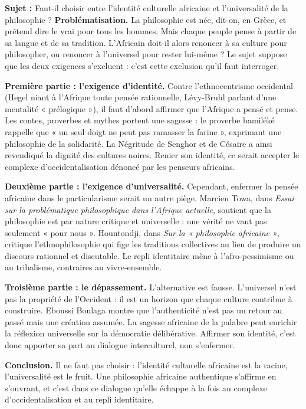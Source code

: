 \documentclass[11pt]{article}
\begin{document}
\begin{exoresolu}
\textbf{Sujet :} Faut-il choisir entre l'identité culturelle africaine et l'universalité de la philosophie ?
\tcblower
\textbf{Problématisation.} La philosophie est née, dit-on, en Grèce, et prétend dire le vrai pour tous les hommes. Mais chaque peuple pense à partir de sa langue et de sa tradition. L'Africain doit-il alors renoncer à sa culture pour philosopher, ou renoncer à l'universel pour rester lui-même ? Le sujet suppose que les deux exigences s'excluent : c'est cette exclusion qu'il faut interroger.

\textbf{Première partie : l'exigence d'identité.} Contre l'ethnocentrisme occidental (Hegel niant à l'Afrique toute pensée rationnelle, Lévy-Bruhl parlant d'une mentalité « prélogique »), il faut d'abord affirmer que l'Afrique a pensé et pense. Les contes, proverbes et mythes portent une sagesse : le proverbe bamiléké rappelle que « un seul doigt ne peut pas ramasser la farine », exprimant une philosophie de la solidarité. La Négritude de Senghor et de Césaire a ainsi revendiqué la dignité des cultures noires. Renier son identité, ce serait accepter le complexe d'occidentalisation dénoncé par les penseurs africains.

\textbf{Deuxième partie : l'exigence d'universalité.} Cependant, enfermer la pensée africaine dans le particularisme serait un autre piège. Marcien Towa, dans \emph{Essai sur la problématique philosophique dans l'Afrique actuelle}, soutient que la philosophie est par nature critique et universelle : une vérité ne vaut pas seulement « pour nous ». Hountondji, dans \emph{Sur la « philosophie africaine »}, critique l'ethnophilosophie qui fige les traditions collectives au lieu de produire un discours rationnel et discutable. Le repli identitaire mène à l'afro-pessimisme ou au tribalisme, contraires au vivre-ensemble.

\textbf{Troisième partie : le dépassement.} L'alternative est fausse. L'universel n'est pas la propriété de l'Occident : il est un horizon que chaque culture contribue à construire. Eboussi Boulaga montre que l'authenticité n'est pas un retour au passé mais une création assumée. La sagesse africaine de la palabre peut enrichir la réflexion universelle sur la démocratie délibérative. Affirmer son identité, c'est donc apporter sa part au dialogue interculturel, non s'enfermer.

\textbf{Conclusion.} Il ne faut pas choisir : l'identité culturelle africaine est la racine, l'universalité est le fruit. Une philosophie africaine authentique s'affirme en s'ouvrant, et c'est dans ce dialogue qu'elle échappe à la fois au complexe d'occidentalisation et au repli identitaire.
\end{exoresolu}
\end{document}
